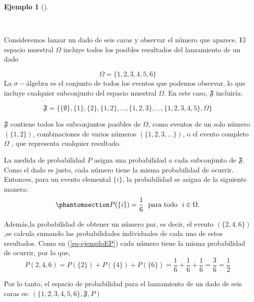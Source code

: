 \documentclass[
  us-letterpaper,
]{scrreprt}
\theoremstyle{plain}
\theoremstyle{definition}
\theoremstyle{definition}
\newtheorem{example}{Ejemplo}[chapter]
\theoremstyle{remark}
\begin{document}
\begin{example}[]\protect\hypertarget{exm-ELDADO}{}\label{exm-ELDADO}

~

\begin{tcolorbox}[enhanced jigsaw, colback=white, toptitle=1mm, arc=.35mm, rightrule=.15mm, left=2mm, colframe=quarto-callout-caution-color-frame, breakable, leftrule=.75mm, colbacktitle=quarto-callout-caution-color!10!white, coltitle=black, opacityback=0, bottomtitle=1mm, bottomrule=.15mm, titlerule=0mm, opacitybacktitle=0.6, toprule=.15mm, title={Ejemplo de lanzamiento de un dado}]

Consideremos lanzar un dado de seis caras y observar el número que
aparece. El espacio muestral \(\Omega\) incluye todos los posibles
resultados del lanzamiento de un dado

\[\Omega = \{1,2,3,4,5,6 \}\] La \(\sigma-\text{álgebra}\) es el
conjunto de todos los eventos que podemos observar, lo que incluye
cualquier subconjunto del espacio muestral \(\Omega\). En este caso,
\(\mathfrak{F}\) incluiría:

\[
\mathfrak{F} = \{ \{\emptyset\},\{1\},\{2\},\{1,2\},\dots,\{1,2,3\},\dots,\{1,2,3,4,5\},\Omega\}
\]

\(\mathfrak{F}\) contiene todos los subconjuntos posibles de \(\Omega\),
como eventos de un solo número \((\{1,2\})\), combinaciones de varios
números \((\{1,2,3,\dots\})\), o el evento completo \(\Omega\) , que
representa cualquier resultado.

La medida de probabilidad \(P\) asigna una probabilidad a cada
subconjunto de \(\mathfrak{F}\). Como el dado es justo, cada número
tiene la misma probabilidad de ocurrir. Entonces, para un evento
elemental \(\{i\}\), la probabilidad se asigna de la siguiente manera:
\begin{equation}\phantomsection\label{eq-ejemploEP}{
P(\{i\})= \dfrac{1}{6} \ \ \text{para todo} \ \  i \in \Omega.
}\end{equation}

Además,la probabilidad de obtener un número par, es decir, el evento
\((\{2,4,6\})\),se calcula sumando las probabilidades individuales de
cada uno de estos resultados. Como en (\ref{eq-ejemploEP}) cada número
tiene la misma probabilidad de ocurrir, por lo que,
\[P({2,4,6}) = P(\{2\}) + P(\{4\}) + P(\{6\}) = \frac{1}{6} + \frac{1}{6} +\frac{1}{6} = \frac{3}{6} = \frac{1}{2} \]

Por lo tanto, el espacio de probabilidad para el lanzamiento de un dado
de seis caras es: \(( \{1,2,3,4,5,6 \},\mathfrak{F},P)\)

\end{tcolorbox}

\end{example}
\end{document}

